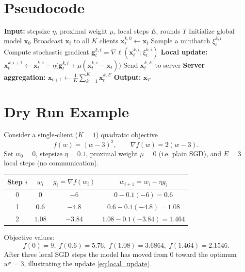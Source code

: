 \documentclass{article}
\begin{document}
\section*{Pseudocode}
\begin{algorithm}[H]
\caption{FedProx}
\begin{algorithmic}[1]
\State \textbf{Input:} stepsize $\eta$, proximal weight $\mu$, local steps $E$, rounds $T$
\State Initialize global model $\bm{x}_0$
    \State Broadcast $\bm{x}_t$ to all $K$ clients
        \State $\bm{x}_{t}^{k,0}\gets \bm{x}_t$
            \State Sample a minibatch $\xi_{t}^{k,i}$
            \State Compute stochastic gradient $\bm{g}_{t}^{k,i}= \nabla \ell(\bm{x}_{t}^{k,i};\xi_{t}^{k,i})$
            \State \textbf{Local update:}
            \State $\bm{x}_{t}^{k,i+1}\gets \bm{x}_{t}^{k,i}
                -\eta\bigl(\bm{g}_{t}^{k,i}+\mu(\bm{x}_{t}^{k,i}-\bm{x}_t)\bigr)$
        \EndFor
        \State Send $\bm{x}_{t}^{k,E}$ to server
    \EndFor
    \State \textbf{Server aggregation:}
    \State $\displaystyle \bm{x}_{t+1}\gets \frac1K\sum_{k=1}^{K}\bm{x}_{t}^{k,E}$
\EndFor
\State \textbf{Output:} $\bm{x}_T$
\end{algorithmic}
\end{algorithm}

\section*{Dry Run Example}
Consider a single‑client ($K=1$) quadratic objective
\[
f(w)= (w-3)^2,\qquad \nabla f(w)=2(w-3).
\]
Set $w_0=0$, stepsize $\eta=0.1$, proximal weight $\mu=0$ (i.e. plain SGD),
and $E=3$ local steps (no communication).

\begin{center}
\begin{tabular}{c|c|c|c}
\textbf{Step $i$} & $w_{i}$ & $g_i=\nabla f(w_i)$ & $w_{i+1}=w_i-\eta g_i$ \\ \hline
0 & $0$ & $-6$ & $0-0.1(-6)=0.6$ \\
1 & $0.6$ & $-4.8$ & $0.6-0.1(-4.8)=1.08$ \\
2 & $1.08$ & $-3.84$ & $1.08-0.1(-3.84)=1.464$ \\
\end{tabular}
\end{center}
Objective values:
\[
f(0)=9,\; f(0.6)=5.76,\; f(1.08)=3.6864,\; f(1.464)=2.1546.
\]
After three local SGD steps the model has moved from $0$ toward the optimum
$w^\star=3$, illustrating the update \eqref{eq:local_update}.
\end{document}

